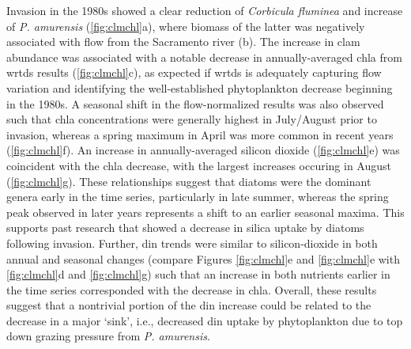 \documentclass[journal = esthag, manuscript = article]{achemso}\usepackage[]{graphicx}\usepackage[]{color}
\begin{document}
Invasion in the 1980s showed a clear reduction of \textit{Corbicula fluminea} and increase of \textit{P. amurensis} (\cref{fig:clmchl}a), where biomass of the latter was negatively associated with flow from the Sacramento river (b).  The increase in clam abundance was associated with a notable decrease in annually-averaged \ac{chla} from \ac{wrtds} results (\cref{fig:clmchl}c), as expected if \ac{wrtds} is adequately capturing flow variation and identifying the well-established phytoplankton decrease beginning in the 1980s.  A seasonal shift in the flow-normalized results was also observed such that \ac{chla} concentrations were generally highest in July/August prior to invasion, whereas a spring maximum in April was more common in recent years (\cref{fig:clmchl}f).  An increase in annually-averaged silicon dioxide (\cref{fig:clmchl}e) was coincident with the \ac{chla} decrease, with the largest increases occuring in August (\cref{fig:clmchl}g).  These relationships suggest that diatoms were the dominant genera early in the time series, particularly in late summer, whereas the spring peak observed in later years represents a shift to an earlier seasonal maxima.  This supports past research that showed a decrease in silica uptake by diatoms following invasion.\cite{Cloern96,Kimmerer05} Further, \ac{din} trends were similar to silicon-dioxide in both annual and seasonal changes (compare Figures \ref{fig:clmchl}e and \ref{fig:clmchl}e with \ref{fig:clmchl}d and \ref{fig:clmchl}g) such that an increase in both nutrients earlier in the time series corresponded with the decrease in \ac{chla}.  Overall, these results suggest that a nontrivial portion of the \ac{din} increase could be related to the decrease in a major `sink', i.e., decreased \ac{din} uptake by phytoplankton due to top down grazing pressure from \textit{P. amurensis}.
\end{document}
